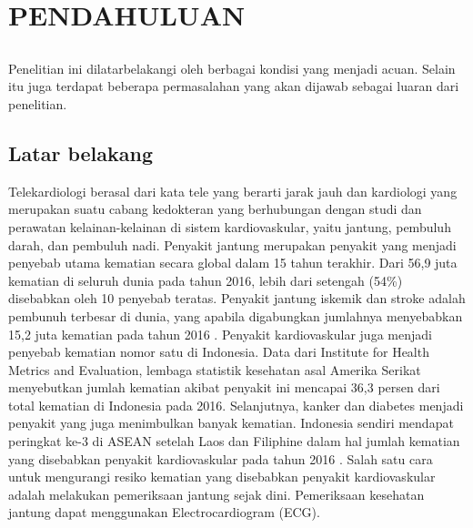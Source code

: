 \chapter{PENDAHULUAN}
\vspace{1ex}

\section*{}
Penelitian ini dilatarbelakangi oleh berbagai kondisi yang menjadi acuan. Selain itu juga terdapat beberapa permasalahan yang akan dijawab sebagai luaran dari penelitian.
\vspace{1ex}

\section{Latar belakang}
\vspace{1ex}

Telekardiologi berasal dari kata tele yang berarti jarak jauh dan kardiologi yang merupakan suatu cabang kedokteran yang berhubungan dengan studi dan perawatan kelainan-kelainan di sistem kardiovaskular, yaitu jantung, pembuluh darah, dan pembuluh nadi\cite{cit:1}. Penyakit jantung merupakan penyakit yang menjadi penyebab utama kematian secara global dalam 15 tahun terakhir. Dari 56,9 juta kematian di seluruh dunia pada tahun 2016, lebih dari setengah (54\%) disebabkan oleh 10 penyebab teratas. Penyakit jantung iskemik dan stroke adalah pembunuh terbesar di dunia, yang apabila digabungkan jumlahnya menyebabkan  15,2 juta kematian pada tahun 2016 \cite{cit:2}. Penyakit kardiovaskular juga menjadi penyebab kematian nomor satu di Indonesia. Data dari Institute for Health Metrics and Evaluation, lembaga statistik kesehatan asal Amerika Serikat menyebutkan jumlah kematian akibat penyakit ini mencapai 36,3 persen dari total kematian di Indonesia pada 2016. Selanjutnya, kanker dan diabetes menjadi penyakit yang juga menimbulkan banyak kematian. Indonesia sendiri mendapat peringkat ke-3 di ASEAN setelah Laos dan Filiphine dalam hal jumlah kematian yang disebabkan penyakit kardiovaskular pada tahun 2016 \cite{cit:3}. Salah satu cara untuk mengurangi resiko kematian yang disebabkan penyakit kardiovaskular adalah melakukan pemeriksaan jantung sejak dini. Pemeriksaan kesehatan jantung dapat menggunakan Electrocardiogram (ECG).\

